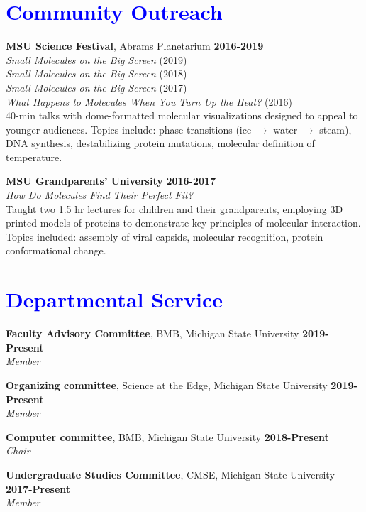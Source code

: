\documentclass[margin,line]{res}
\begin{document}
\begin{resume}
\section{\sc \textcolor{blue}{Community Outreach}}
        {\bf MSU Science Festival}, Abrams Planetarium \hfill {\bf 2016-2019} \\
        \emph{Small Molecules on the Big Screen} (2019)\\
        \emph{Small Molecules on the Big Screen} (2018)\\
        \emph{Small Molecules on the Big Screen} (2017)\\
        \emph{What Happens to Molecules When You Turn Up the Heat?} (2016)\\
        40-min talks with dome-formatted molecular visualizations designed to appeal to younger audiences.  Topics include: phase transitions (ice $\rightarrow$ water $\rightarrow$ steam), DNA synthesis, destabilizing protein mutations, molecular definition of temperature.

        {\bf MSU Grandparents' University} \hfill {\bf 2016-2017} \\
        \emph{How Do Molecules Find Their Perfect Fit?}\\
        Taught two 1.5 hr lectures for children and their grandparents, employing 3D printed models of proteins to demonstrate key principles of molecular interaction.  Topics included: assembly of viral capsids, molecular recognition, protein conformational change.

\section{\sc \textcolor{blue}{ Departmental Service}}
        
        {\bf Faculty Advisory Committee}, BMB, Michigan State University \hfill {\bf 2019-Present}\\
        {\emph {Member}}

        {\bf Organizing committee}, Science at the Edge, Michigan State University \hfill {\bf 2019-Present}\\
        {\emph {Member}}

        {\bf Computer committee}, BMB, Michigan State University \hfill {\bf 2018-Present}\\
        {\emph {Chair}}

        {\bf Undergraduate Studies Committee}, CMSE, Michigan State University \hfill {\bf 2017-Present}\\
        {\emph {Member}}


\end{resume}
\end{document}
